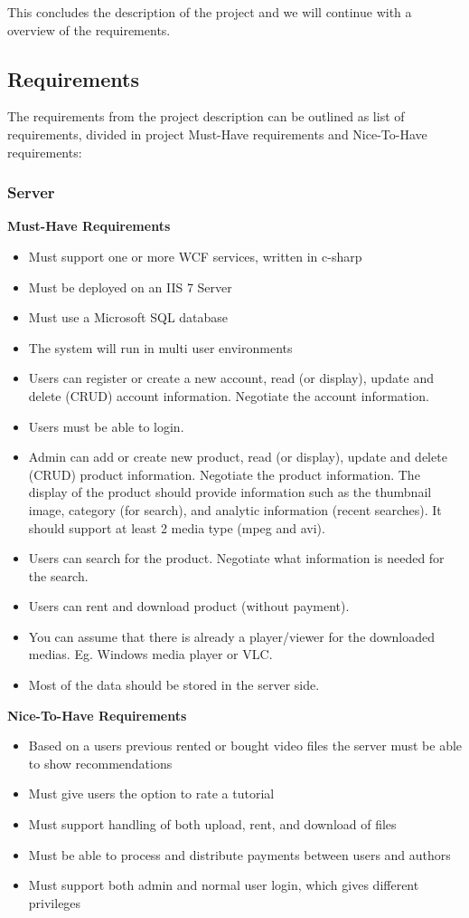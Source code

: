 This concludes the description of the project and we will continue with a overview of the requirements.  

\subsection{Requirements} \label{Requirements}
The requirements from the project description can be outlined as list of requirements, divided in project Must-Have requirements and Nice-To-Have requirements:

\subsubsection{Server}

\textbf{Must-Have Requirements}
\begin{itemize}
	\item Must support one or more WCF services, written in c-sharp
	\item Must be deployed on an IIS 7 Server
	\item Must use a Microsoft SQL database
	\item The system will run in multi user environments
	\item Users can register or create a new account, read (or display), update and delete (CRUD) account information. 			Negotiate the account information.
	\item Users must be able to login.
	\item Admin can add or create new product, read (or display), update and delete (CRUD) product information. 				Negotiate the product information. The display of the product should provide information such as the thumbnail 			image, category (for search), and analytic information (recent searches). It should support at least 2 media type 			(mpeg and avi).
	\item Users can search for the product. Negotiate what information is needed for the search.
	\item Users can rent and download product (without payment).
	\item You can assume that there is already a player/viewer for the downloaded medias. Eg. Windows media player or 			VLC.
	\item Most of the data should be stored in the server side.
\end{itemize}
\textbf{Nice-To-Have Requirements}
\begin{itemize}
	\item Based on a users previous rented or bought video files the server must be able to show recommendations
	\item Must give users the option to rate a tutorial
	\item Must support handling of both upload, rent, and download of files
	\item Must be able to process and distribute payments between users and authors
	\item Must support both admin and normal user login, which gives different privileges
\end{itemize}

